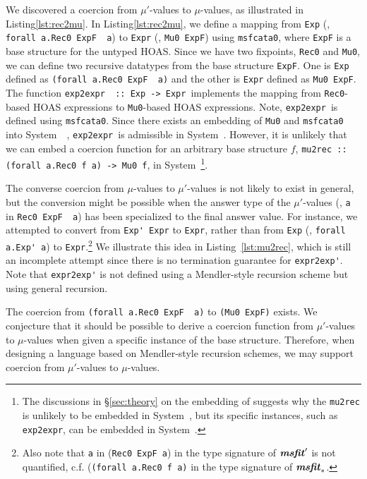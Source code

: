 We discovered a coercion from $\mu'$-values to $\mu$-values,
as illustrated in Listing\;\ref{lst:rec2mu}. In Listing\;\ref{lst:rec2mu},
we define a mapping from \lstinline{Exp}
(\ie, \lstinline{forall a.Rec0 ExpF  a})
to \lstinline{Expr} (\ie, \lstinline{Mu0 ExpF})
using \lstinline{msfcata0}, where
\lstinline{ExpF} is a base structure for the untyped HOAS.
Since we have two fixpoints, \lstinline{Rec0} and \lstinline{Mu0},
we can define two recursive datatypes from the base structure \lstinline{ExpF}.
One is \lstinline{Exp} defined as \lstinline{(forall a.Rec0 ExpF  a)} and
the other is \lstinline{Expr} defined as \lstinline{Mu0 ExpF}.
The function \lstinline{exp2expr  :: Exp -> Expr}\, implements the mapping
from \lstinline{Rec0}-based HOAS expressions to \lstinline{Mu0}-based
HOAS expressions. Note, \lstinline{exp2expr}\, is defined using
\lstinline{msfcata0}.  Since there exists an embedding of
\lstinline{Mu0} and \lstinline{msfcata0} into System~\Fw\ \cite{AhnShe11},
\lstinline{exp2expr}\, is admissible in System~\Fw. However, it is unlikely
that we can embed a coercion function for an arbitrary base structure $f$,
\lstinline{mu2rec :: (forall a.Rec0 f a) -> Mu0 f}, in System~\Fw\footnote{
	The discussions in \S\ref{sec:theory} on the embedding of \msfit{}
	suggests why the \lstinline{mu2rec} is unlikely to be embedded
	in System~\Fw, but its specific instances, such as
	\lstinline{exp2expr}, can be embedded in System~\Fw.}.

The converse coercion from $\mu$-values to $\mu'$-values
is not likely to exist in general, but the conversion might
be possible when the answer type of the $\mu'$-values (\eg, \lstinline{a}
in \lstinline{Rec0 ExpF  a}) has been specialized to the final answer value.
For instance, we attempted to convert from
\lstinline{Exp' Expr} to \lstinline{Expr}, rather than from \lstinline{Exp}
(\ie, \lstinline{forall a.Exp' a}) to \lstinline{Expr}.\footnote{
	Also note that \lstinline{a} in
	(\lstinline{Rec0}~\lstinline{ExpF}~\lstinline{a})
	in the type signature of $\textbf{\textit{msfit}}_{}'$
	is not quantified, {c.f.} (\lstinline{(forall a.Rec0 f a)}
	in the type signature of $\textbf{\textit{msfit}}_{*}$.}
We illustrate this idea in Listing~\ref{lst:mu2rec}, which is still
an incomplete attempt since there is no termination guarantee for
\lstinline{expr2exp'}. Note that \lstinline{expr2exp'} is not defined
using a Mendler-style recursion scheme but using general recursion.

The coercion from \lstinline{(forall a.Rec0 ExpF  a)}
to \lstinline{(Mu0 ExpF)} exists.
We conjecture that
it should be possible to derive a coercion function
from $\mu'$-values to $\mu$-values when given a specific instance of
the base structure.
Therefore, when designing a language based on Mendler-style
recursion schemes, we may support coercion from $\mu'$-values to $\mu$-values.


